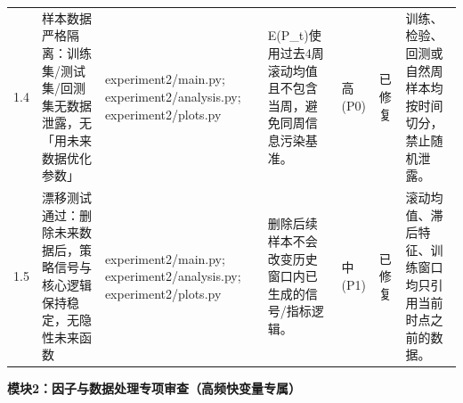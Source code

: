 \begin{longtable}{@{}L{0.045\textwidth}L{0.190\textwidth}L{0.140\textwidth}L{0.190\textwidth}L{0.060\textwidth}L{0.060\textwidth}L{0.205\textwidth}@{}}
1.4 & 样本数据严格隔离：训练集/\allowbreak{}测试集/\allowbreak{}回测集无数据泄露，无「用未来数据优化参数」 & experiment2/\allowbreak{}main.py;\allowbreak{} experiment2/\allowbreak{}analysis.py;\allowbreak{} experiment2/\allowbreak{}plots.py & E(P\_\allowbreak{}t)使用过去4周滚动均值且不包含当周，避免同周信息污染基准。 & 高(P0) & 已修复 & 训练、检验、回测或自然周样本均按时间切分，禁止随机泄露。 \\
1.5 & 漂移测试通过：删除未来数据后，策略信号与核心逻辑保持稳定，无隐性未来函数 & experiment2/\allowbreak{}main.py;\allowbreak{} experiment2/\allowbreak{}analysis.py;\allowbreak{} experiment2/\allowbreak{}plots.py & 删除后续样本不会改变历史窗口内已生成的信号/\allowbreak{}指标逻辑。 & 中(P1) & 已修复 & 滚动均值、滞后特征、训练窗口均只引用当前时点之前的数据。 \\
\end{longtable}
\endgroup

\textbf{模块2：因子与数据处理专项审查（高频快变量专属）}


